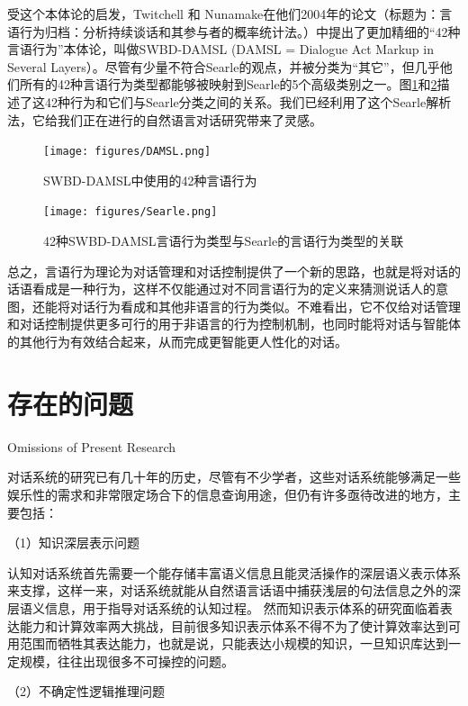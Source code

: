 受这个本体论的启发，Twitchell 和 Nunamake在他们2004年的论文（标题为：言语行为归档：分析持续谈话和其参与者的概率统计法。\cite{Twitchell2004}）中提出了更加精细的“42种言语行为”本体论，叫做SWBD-DAMSL (DAMSL = Dialogue Act Markup in Several Layers）。尽管有少量不符合Searle的观点，并被分类为“其它”，但几乎他们所有的42种言语行为类型都能够被映射到Searle的5个高级类别之一。图\ref{fig:DAMSL}和\ref{fig:Searle}描述了这42种行为和它们与Searle分类之间的关系。我们已经利用了这个Searle解析法，它给我们正在进行的自然语言对话研究带来了灵感。

\begin{figure}[htb]
\centering
\texttt{[image: figures/DAMSL.png]}
\caption{SWBD-DAMSL中使用的42种言语行为}
\label{fig:DAMSL}
\end{figure}

\begin{figure}[htb]
\centering
\texttt{[image: figures/Searle.png]}
\caption{ 42种SWBD-DAMSL言语行为类型与Searle的言语行为类型的关联}
\label{fig:Searle}
\end{figure}


总之，言语行为理论为对话管理和对话控制提供了一个新的思路，也就是将对话的话语看成是一种行为，这样不仅能通过对不同言语行为的定义来猜测说话人的意图，还能将对话行为看成和其他非语言的行为类似。不难看出，它不仅给对话管理和对话控制提供更多可行的用于非语言的行为控制机制，也同时能将对话与智能体的其他行为有效结合起来，从而完成更智能更人性化的对话。

\section{存在的问题}{Omissions of Present Research}

对话系统的研究已有几十年的历史，尽管有不少学者，这些对话系统能够满足一些娱乐性的需求和非常限定场合下的信息查询用途，但仍有许多亟待改进的地方，主要包括：

（1）知识深层表示问题

        认知对话系统首先需要一个能存储丰富语义信息且能灵活操作的深层语义表示体系来支撑，这样一来，对话系统就能从自然语言话语中捕获浅层的句法信息之外的深层语义信息，用于指导对话系统的认知过程。 然而知识表示体系的研究面临着表达能力和计算效率两大挑战，目前很多知识表示体系不得不为了使计算效率达到可用范围而牺牲其表达能力，也就是说，只能表达小规模的知识，一旦知识库达到一定规模，往往出现很多不可操控的问题。

（2）不确定性逻辑推理问题

